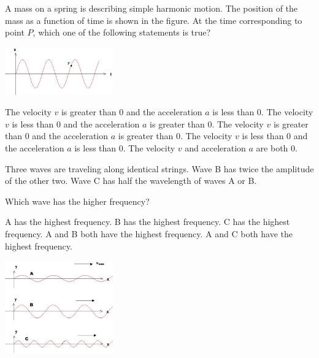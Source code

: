 \documentclass[letterpaper,addpoints,answers]{exam}
\begin{document}
\begin{questions}
\begin{question}[5]
\begin{multicols}{2}
A mass on a spring is describing simple harmonic motion. The position of the mass as a function of time is shown in the figure. At the time corresponding to point $P$, which one of the following statements is true?
\begin{center}
\includegraphics[width=0.35\textwidth]{oscillation}
\end{center}
\end{multicols}
\begin{checkboxes}
 \correctchoice The velocity $v$ is greater than 0 and the acceleration $a$ is less than 0.
 \choice The velocity $v$ is less than 0 and the acceleration $a$ is greater than 0.
 \choice The velocity $v$ is greater than 0 and the acceleration $a$ is greater than 0.
 \choice The velocity $v$ is less than 0 and the acceleration $a$ is less than 0.
 \choice The velocity $v$ and acceleration $a$ are both 0.
\end{checkboxes}
\end{question}

\pagebreak

\begin{question}[5]
\begin{multicols}{2}
Three waves are traveling along identical strings. Wave B has twice the amplitude of the other two. Wave C has half the wavelength of waves A or B.

Which wave has the higher frequency?
\begin{checkboxes}
 \choice A has the highest frequency.
 \choice B has the highest frequency.
 \correctchoice C has the highest frequency.
 \choice A and B both have the highest frequency.
 \choice A and C both have the highest frequency.
\end{checkboxes}
\begin{center}
\includegraphics[width=0.35\textwidth]{waves}
\end{center}
\end{multicols}
\end{question}


\end{questions}
\end{document}
